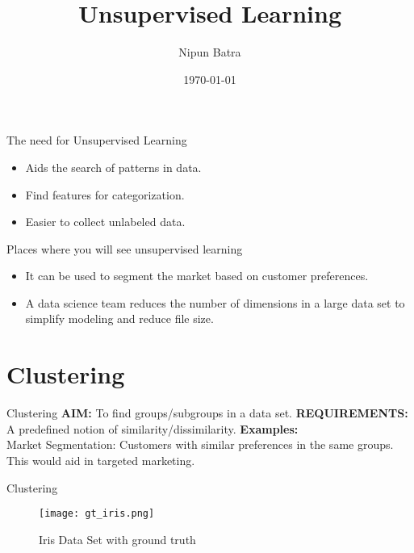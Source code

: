 \documentclass{beamer}
\title{Unsupervised Learning}
\date{\today}
\author{Nipun Batra}
\institute{IIT Gandhinagar}
\begin{document}
  \maketitle

\begin{frame}{The need for Unsupervised Learning}
\begin{itemize}
\item Aids the search of patterns in data.
\item Find features for categorization.
\item Easier to collect unlabeled data.
\end{itemize}
\pause
Places where you will see unsupervised learning 
\begin{itemize}
\item It can be used to segment the market based on customer preferences.
\item A data science team reduces the number of dimensions in a large data set to simplify modeling and reduce file size.
\end{itemize}
\end{frame}

\section{Clustering}

\begin{frame}{Clustering}
\textbf{AIM:} To find groups/subgroups in a data set.
\pause
\textbf{REQUIREMENTS:} A predefined notion of similarity/dissimilarity.
\pause
\textbf{Examples:} \\
Market Segmentation: Customers with similar preferences in the same groups. This would aid in targeted marketing.
\end{frame}

\begin{frame}{Clustering}
\begin{figure}[htp]
    \centering
    \texttt{[image: gt\_iris.png]}
    \caption{Iris Data Set with ground truth}
\end{figure}
\end{frame}
\end{document}
